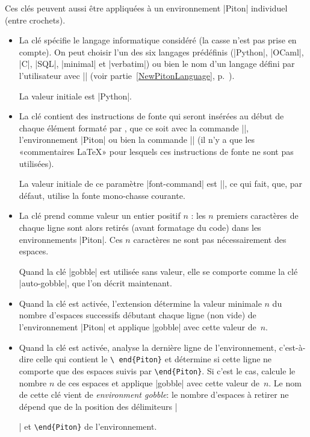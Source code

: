 \documentclass[dvipsnames,svgnames]{article}
\begin{document}
Ces clés peuvent aussi être appliquées à un environnement |{Piton}| individuel (entre
crochets).

\begin{itemize}
\item La clé  spécifie le langage informatique considéré (la casse
n'est pas prise en compte). On peut choisir l'un des six langages prédéfinis (|Python|,
|OCaml|, |C|, |SQL|, |minimal| et |verbatim|) ou bien le nom d'un langage défini par
l'utilisateur avec |\NewPitonLanguage| (voir partie~\ref{NewPitonLanguage},
p.~\pageref{NewPitonLanguage}). 

La valeur initiale est |Python|.

\item {} La clé  contient des
instructions de fonte qui seront insérées au début de chaque élément formaté par
, que ce soit avec la commande |\piton|, l'environnement |{Piton}| ou
bien la commande |\PitonInputFile| (il n'y a que les «commentaires LaTeX» pour
lesquels ces instructions de fonte ne sont pas utilisées).

La valeur initiale de ce paramètre |font-command| est |\ttfamily|, ce qui fait,
que, par défaut,  utilise la fonte mono-chasse courante.

\item {}\label{gobble} La clé  prend comme valeur
un entier positif $n$ : les $n$ premiers caractères de chaque ligne sont alors
retirés (avant formatage du code) dans les environnements |{Piton}|. Ces $n$
caractères ne sont pas nécessairement des espaces.

Quand la clé |gobble| est utilisée sans valeur, elle se comporte comme la clé
|auto-gobble|, que l'on décrit maintenant.

\item {} Quand la clé
 est activée, l'extension  détermine la
valeur minimale $n$ du nombre d'espaces successifs débutant chaque ligne (non
vide) de l'environnement |{Piton}| et applique |gobble| avec cette valeur
de~$n$.

\item {} Quand la clé
 est activée,  analyse la dernière ligne de
l'environnement, c'est-à-dire celle qui contient le \texttt{\textbackslash
  end\{Piton\}} et détermine si cette ligne ne comporte que des espaces suivis
par \texttt{\textbackslash end\{Piton\}}. Si c'est le cas,  calcule
le nombre $n$ de ces espaces et applique |gobble| avec cette valeur de~$n$. Le
nom de cette clé vient de \emph{environment gobble}: le nombre d'espaces à
retirer ne dépend que de la position des délimiteurs |\begin{Piton}| et
\texttt{\textbackslash end\{Piton\}} de l'environnement.



\end{Piton}
\end{itemize}
\end{document}
